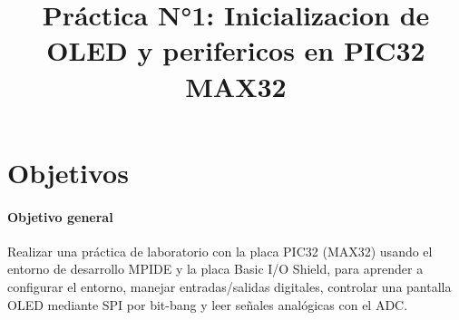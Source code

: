 \documentclass[a4paper,12pt]{article}
\title{Práctica N°1: Inicializacion de OLED y perifericos en PIC32 MAX32}
\date{}
\begin{document}
\maketitle
\tableofcontents
\newpage

\section{Objetivos}

\paragraph{Objetivo general}
Realizar una práctica de laboratorio con la placa PIC32 (MAX32) usando el entorno de desarrollo MPIDE y la placa Basic I/O Shield, para aprender a configurar el entorno, manejar entradas/salidas digitales, controlar una pantalla OLED mediante SPI por bit-bang y leer señales analógicas con el ADC.
\end{document}

